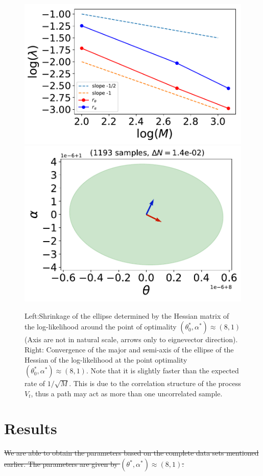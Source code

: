 \documentclass[ima, 20pt, portrait, plainboxedsections]{sciposter}
\providecommand{\DIFdel}[1]{{\protect\color{red}\sout{#1}}}                      %
\providecommand{\DIFdelbegin}{} %
\begin{document}
\begin{multicols}{3}
\begin{figure}[t]
\begin{center}
    \includegraphics[width=0.6\linewidth]{ellipse_conv_samples_dN=14e-02.pdf}
   \includegraphics[width=0.6\linewidth]{ellipse1193_samples_dN=14e-02.pdf}
\end{center}
   \caption{Left:Shrinkage of the ellipse determined by the Hessian matrix of the log-likelihood around the point of optimality $(\theta_0^*, \alpha^*)\approx (8,1)$ (Axis are not in natural scale, arrows only to  eignevector direction). Right: Convergence of the major and semi-axis of the ellipse  of the Hessian of the log-likelihood at the point optimality $(\theta_0^*, \alpha^*)\approx (8,1)$. Note that it is slightly faster than the expected rate of $1/\sqrt{M}$. This is due to the correlation structure of the process $V_t$, thus a path may act  as more than one  uncorrelated sample.}
\label{ellipse_drawing}
\end{figure}


\section*{Results}
\DIFdelbegin \DIFdel{We are able to obtain the parameters based on the complete data sets mentioned earlier. The parameters are given by $(\theta^*, \alpha^*)\approx (8,1)$.
 }%



\end{multicols}
\end{document}

